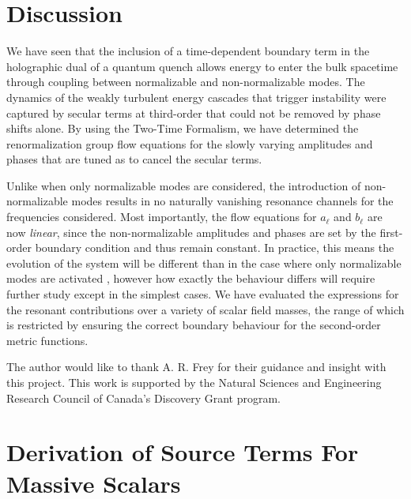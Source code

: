 \documentclass[letterpaper,11pt]{article}
\begin{document}

\section{Discussion}
\label{sec: discussion}

We have seen that the inclusion of a time-dependent boundary term in the holographic dual of a quantum quench allows energy to enter the bulk spacetime through coupling between normalizable and non-normalizable modes. The dynamics of the weakly turbulent energy cascades that trigger instability were captured by secular terms at third-order that could not be removed by phase shifts alone. By using the Two-Time Formalism, we have determined the renormalization group flow equations for the slowly varying amplitudes and phases that are tuned as to cancel the secular terms. 

Unlike when only normalizable modes are considered, the introduction of non-normalizable modes results in no naturally vanishing resonance channels for the frequencies considered. Most importantly, the flow equations for $a_\ell$ and $b_\ell$ are now \emph{linear}, since the non-normalizable amplitudes and phases are set by the first-order boundary condition and thus remain constant. In practice, this means the evolution of the system will be different than in the case where only normalizable modes are activated \cite{TTF}, however how exactly the behaviour differs will require further study except in the simplest cases. We have evaluated the expressions for the resonant contributions over a variety of scalar field masses, the range of which is restricted by ensuring the correct boundary behaviour for the second-order metric functions. 


\acknowledgments The author would like to thank A. R. Frey for their guidance and insight with this project. This work is supported by the Natural Sciences and Engineering Research Council of Canada's Discovery Grant program.


\appendix
\section{Derivation of Source Terms For Massive Scalars}
\label{app: source term derivation}
\end{document}
